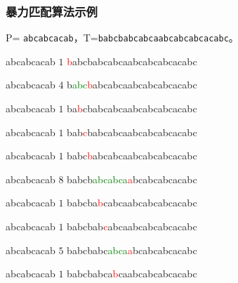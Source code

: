 \documentclass{ctexbeamer}
\newcommand{\red}[1]{\textcolor{red}{#1}}
\newcommand{\green}[1]{\textcolor{green}{#1}}
\begin{document}
\begin{frame}[fragile]
\frametitle{暴力匹配算法示例}
P= \texttt{abcabcacab}，T=\texttt{babcbabcabcaabcabcabcacabc}。

\begin{minipage}[t]{0.5\textwidth}
\begin{tverb}[frame=bottomline, fontsize=\small]
abcabcacab \(1\)
\red{b}abcbabcabcaabcabcabcacabc
\end{tverb}

\begin{tverb}[frame=bottomline, fontsize=\small]
 abcabcacab \(4\)
b\green{abc}\red{b}abcabcaabcabcabcacabc
\end{tverb}


\begin{tverb}[frame=bottomline, fontsize=\small]
  abcabcacab \(1\)
ba\red{b}cbabcabcaabcabcabcacabc
\end{tverb}

\begin{tverb}[frame=bottomline, fontsize=\small]
   abcabcacab \(1\)
bab\red{c}babcabcaabcabcabcacabc
\end{tverb}

\begin{tverb}[frame=bottomline, fontsize=\small]
    abcabcacab \(1\)
babc\red{b}abcabcaabcabcabcacabc
\end{tverb}

\begin{tverb}[frame=bottomline, fontsize=\small]
     abcabcacab \(8\)
babcb\green{abcabca}\red{a}bcabcabcacabc
\end{tverb}

\begin{tverb}[frame=bottomline, fontsize=\small]
      abcabcacab \(1\)
babcba\red{b}cabcaabcabcabcacabc
\end{tverb}

\begin{tverb}[frame=bottomline, fontsize=\small]
       abcabcacab \(1\)
babcbab\red{c}abcaabcabcabcacabc
\end{tverb}

\begin{tverb}[frame=bottomline, fontsize=\small]
        abcabcacab \(5\)
babcbabc\green{abca}\red{a}bcabcabcacabc
\end{tverb}

\end{minipage}%
\begin{minipage}[t]{.5\textwidth}

\begin{tverb}[frame=bottomline, fontsize=\small]
         abcabcacab \(1\)
babcbabca\red{b}caabcabcabcacabc
	\end{tverb}


\end{minipage}
\end{frame}
\end{document}

